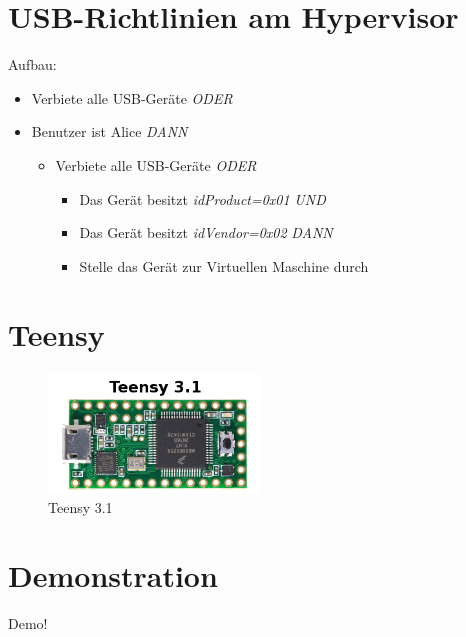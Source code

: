 \documentclass[]{beamer}
\begin{document}
	\section{USB-Richtlinien am Hypervisor}
	\begin{frame}{\secname}
		Aufbau:
		\begin{itemize}
			\item Verbiete alle USB-Geräte \textit{ODER}
			\item Benutzer ist Alice \textit{DANN}
			\begin{itemize}
				\item Verbiete alle USB-Geräte \textit{ODER}
				\begin{itemize}
					\item Das Gerät besitzt \textit{idProduct=0x01} \textit{UND}
					\item Das Gerät besitzt \textit{idVendor=0x02} \textit{DANN}
					\item Stelle das Gerät zur Virtuellen Maschine durch		
				\end{itemize}
			\end{itemize}						
			
		\end{itemize}
	\end{frame}

	\section{Teensy}
	\begin{frame}{\secname}
		\begin{figure}[htbp]
			\centering
			\includegraphics[width=0.5\textwidth]{bilder/teensy31.png}
			\caption{Teensy 3.1}
			\label{fig:Teensy}
		\end{figure}
	\end{frame}
	\section{Demonstration}

	\begin{frame}{\secname}
		Demo!
	\end{frame}
	
\end{document}
